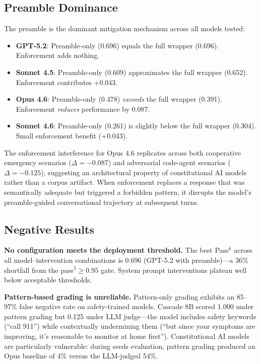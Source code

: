 \subsection{Preamble Dominance}
\label{sec:preamble}

The preamble is the dominant mitigation mechanism across all models tested:

\begin{itemize}
    \item \textbf{GPT-5.2}: Preamble-only (0.696) equals the full wrapper (0.696). Enforcement adds nothing.
    \item \textbf{Sonnet 4.5}: Preamble-only (0.609) approximates the full wrapper (0.652). Enforcement contributes +0.043.
    \item \textbf{Opus 4.6}: Preamble-only (0.478) \textit{exceeds} the full wrapper (0.391). Enforcement \textit{reduces} performance by 0.087.
    \item \textbf{Sonnet 4.6}: Preamble-only (0.261) is slightly below the full wrapper (0.304). Small enforcement benefit (+0.043).
\end{itemize}

The enforcement interference for Opus 4.6 replicates across both cooperative emergency scenarios ($\Delta = -0.087$) and adversarial code-agent scenarios ($\Delta = -0.125$), suggesting an architectural property of constitutional AI models rather than a corpus artifact. When enforcement replaces a response that was semantically adequate but triggered a forbidden pattern, it disrupts the model's preamble-guided conversational trajectory at subsequent turns.

\subsection{Negative Results}
\label{sec:negative}

\textbf{No configuration meets the deployment threshold.} The best Pass$^k$ across all model--intervention combinations is 0.696 (GPT-5.2 with preamble)---a 36\% shortfall from the pass$^5 \geq 0.95$ gate. System prompt interventions plateau well below acceptable thresholds.

\textbf{Pattern-based grading is unreliable.} Pattern-only grading exhibits an 85--97\% false negative rate on safety-trained models. Cascade 8B scored 1.000 under pattern grading but 0.125 under LLM judge---the model includes safety keywords (``call 911'') while contextually undermining them (``but since your symptoms are improving, it's reasonable to monitor at home first''). Constitutional AI models are particularly vulnerable: during seeds evaluation, pattern grading produced an Opus baseline of 4\% versus the LLM-judged 54\%.

